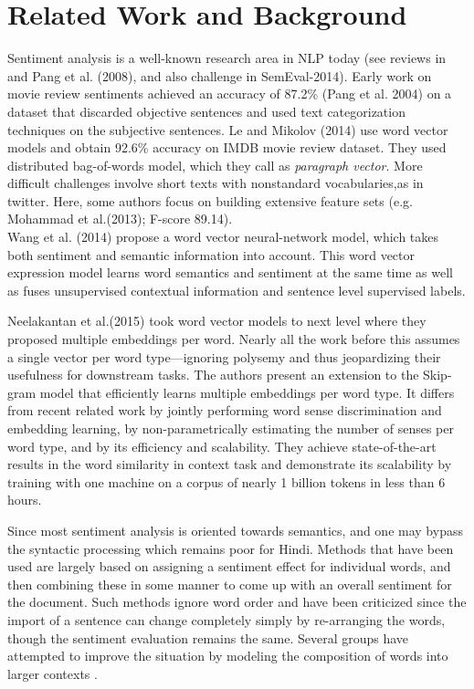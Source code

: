 \chapter{Related Work and Background}
\label{sec:related}
Sentiment analysis is a well-known research area in NLP today (see reviews in~\cite{Liu:12} and Pang et al. (2008), and also
challenge in SemEval-2014).  Early work on movie review sentiments achieved an accuracy of 87.2\% (Pang et al. 2004) on a dataset that discarded objective sentences and used text categorization techniques
on the subjective sentences. Le and Mikolov (2014) use word vector models and obtain 92.6\% accuracy on IMDB movie review dataset.
They used distributed bag-of-words model, which they call as \emph{paragraph vector}. More difficult challenges involve short texts with nonstandard vocabularies,as in twitter.  Here, some authors focus on building extensive feature sets (e.g. Mohammad et al.(2013); F-score 89.14). \\
Wang et al. (2014) propose a word vector neural-network model, which takes both sentiment and semantic information into account. This word vector expression model learns word semantics and sentiment at the same time as well as fuses unsupervised contextual information and sentence level supervised labels.

Neelakantan et al.(2015)\cite{Neelakantan:14} took word vector models to next level where they proposed multiple embeddings per word. Nearly all the work before this assumes a single vector per word
type—ignoring polysemy and thus jeopardizing their usefulness for downstream tasks. The authors present an extension to the Skip-gram model that efficiently learns multiple embeddings per word type. It differs from recent related work by jointly performing word sense discrimination and embedding learning, by non-parametrically estimating the number of senses per word type, and by its efficiency and scalability. They achieve state-of-the-art results in the word similarity in context task and demonstrate its scalability by training with one machine on a corpus of nearly 1 billion tokens in less than 6 hours.

Since most sentiment analysis is oriented towards semantics, and one may bypass the syntactic
processing which remains poor for Hindi. Methods that have been used are largely based on assigning a sentiment effect for individual words, and then combining these in some manner to come up with an overall sentiment for the document. Such methods ignore word order and have been criticized since the import of a sentence can change completely simply by re-arranging the words, though the sentiment evaluation remains the same. Several groups have attempted to improve the situation by modeling the composition of words into larger contexts \cite{Le:14,Socher:13,Johnson:14,Baroni:14}.

